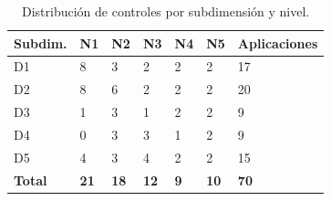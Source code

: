 \begin{table}[H]
  \centering
  \caption{Distribución de controles por subdimensión y nivel.}
  \label{tab:distribucion-controles}
  \begin{tabularx}{\textwidth}{@{}l C{1.5cm} C{1.5cm} C{1.5cm} C{1.5cm} C{1.5cm} C{2.2cm}@{}}
    \toprule
    \textbf{Subdim.} & \textbf{N1} & \textbf{N2} & \textbf{N3} & \textbf{N4} & \textbf{N5} & \textbf{Aplicaciones} \\
    \midrule
    D1 & 8 & 3 & 2 & 2 & 2 & 17 \\
    D2 & 8 & 6 & 2 & 2 & 2 & 20 \\
    D3 & 1 & 3 & 1 & 2 & 2 &  9 \\
    D4 & 0 & 3 & 3 & 1 & 2 &  9 \\
    D5 & 4 & 3 & 4 & 2 & 2 & 15 \\
    \midrule
    \textbf{Total} & \textbf{21} & \textbf{18} & \textbf{12} & \textbf{9} & \textbf{10} & \textbf{70} \\
    \bottomrule
  \end{tabularx}
\end{table}